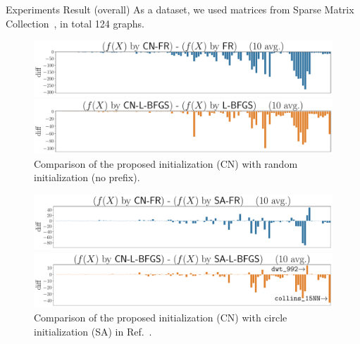 \documentclass[dvipdfmx,13pt,aspectratio=169]{beamer}
\begin{document}
\begin{frame}{Experiments Result (overall)}
  As a dataset, we used matrices from Sparse Matrix Collection~\cite{davis2011university}, in total 124 graphs.
  \begin{figure}[h]
    \centering
    \begin{minipage}{0.5\columnwidth}
      \centering
      \includegraphics[width=\columnwidth]{../main/overall/plot/diff_FR_50.pdf}
    \end{minipage}%
    \begin{minipage}{0.5\columnwidth}
      \centering
      \includegraphics[width=\columnwidth]{../main/overall/plot/diff_L-BFGS_50.pdf}
    \end{minipage}%
    \caption{
      Comparison of the proposed initialization (\textsf{CN}) with random initialization (no prefix).
    }
    \label{fig:overall}
  \end{figure}
  \begin{figure}[h]
    \centering
    \begin{minipage}{0.5\columnwidth}
      \centering
      \includegraphics[width=\columnwidth]{../main/circle/plot/diff_FR_50.pdf}
    \end{minipage}%
    \begin{minipage}{0.5\columnwidth}
      \centering
      \includegraphics[width=\columnwidth]{../main/circle/plot/diff_L-BFGS_50.pdf}
    \end{minipage}%
    \caption{
      Comparison of the proposed initialization (\textsf{CN}) with circle initialization (\textsf{SA}) in Ref.~\cite{ghassemitoosiSimulatedAnnealingPreProcessing2016}.
    }
    \label{fig:diff}
  \end{figure}
\end{frame}
\end{document}

